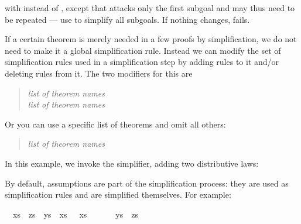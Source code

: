 \begin{isabellebody}
\begin{isamarkuptext}
with  instead of , except that  attacks
only the first subgoal and may thus need to be repeated --- use
 to simplify all subgoals.
If nothing changes,  fails.%
\end{isamarkuptext}%
\isamarkuptrue%
%
\isamarkuptrue%
%
\begin{isamarkuptext}%
%
If a certain theorem is merely needed in a few proofs by simplification,
we do not need to make it a global simplification rule. Instead we can modify
the set of simplification rules used in a simplification step by adding rules
to it and/or deleting rules from it. The two modifiers for this are
\begin{quote}
 \textit{list of theorem names}\\
 \textit{list of theorem names}
\end{quote}
Or you can use a specific list of theorems and omit all others:
\begin{quote}
 \textit{list of theorem names}
\end{quote}
In this example, we invoke the simplifier, adding two distributive
laws:
\begin{quote}
\end{quote}%
\end{isamarkuptext}%
\isamarkuptrue%
%
\isamarkuptrue%
%
\begin{isamarkuptext}%
By default, assumptions are part of the simplification process: they are used
as simplification rules and are simplified themselves. For example:%
\end{isamarkuptext}%
\isamarkuptrue%
\isamarkupfalse%
\ {}{}\ xs\ {}\ zs\ {}\ ys\ {}\ xs{}\ {}{}\ {}\ xs\ {}\ {}{}\ {}\ {}{}\ {}\ {}\ ys\ {}\ zs{}\isanewline

\end{isabellebody}
